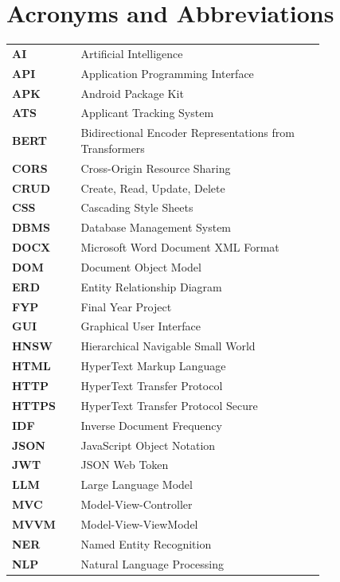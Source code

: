 \chapter*{Acronyms and Abbreviations}

\begin{flushleft}
\begin{tabular}{l p{0.78\linewidth}}
\textbf{AI}    & Artificial Intelligence\\
\textbf{API}   & Application Programming Interface\\
\textbf{APK}   & Android Package Kit\\
\textbf{ATS}   & Applicant Tracking System\\
\textbf{BERT}  & Bidirectional Encoder Representations from Transformers\\
\textbf{CORS}  & Cross-Origin Resource Sharing\\
\textbf{CRUD}  & Create, Read, Update, Delete\\
\textbf{CSS}   & Cascading Style Sheets\\
\textbf{DBMS}  & Database Management System\\
\textbf{DOCX}  & Microsoft Word Document XML Format\\
\textbf{DOM}   & Document Object Model\\
\textbf{ERD}   & Entity Relationship Diagram\\
\textbf{FYP}   & Final Year Project\\
\textbf{GUI}   & Graphical User Interface\\
\textbf{HNSW}  & Hierarchical Navigable Small World\\
\textbf{HTML}  & HyperText Markup Language\\
\textbf{HTTP}  & HyperText Transfer Protocol\\
\textbf{HTTPS} & HyperText Transfer Protocol Secure\\
\textbf{IDF}   & Inverse Document Frequency\\
\textbf{JSON}  & JavaScript Object Notation\\
\textbf{JWT}   & JSON Web Token\\
\textbf{LLM}   & Large Language Model\\
\textbf{MVC}   & Model-View-Controller\\
\textbf{MVVM}  & Model-View-ViewModel\\
\textbf{NER}   & Named Entity Recognition\\
\textbf{NLP}   & Natural Language Processing\\

\end{tabular}
\end{flushleft}
